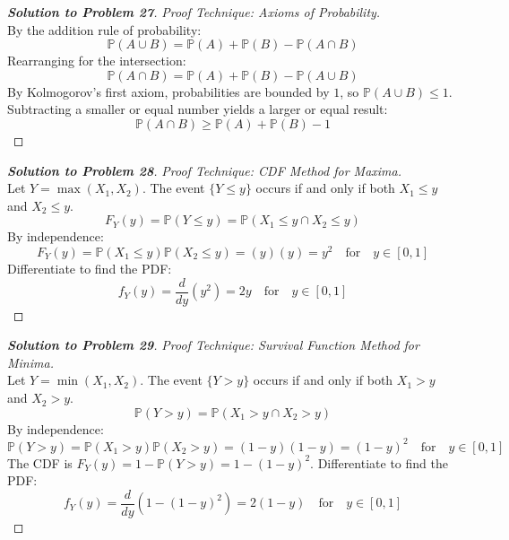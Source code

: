\documentclass[11pt, a4paper]{article}
\theoremstyle{definition}
\theoremstyle{remark}
\newcommand{\Prob}{\mathbb{P}}
\begin{document}
\begin{proof}[\textbf{Solution to Problem 27}]
\textit{Proof Technique: Axioms of Probability.} \\
By the addition rule of probability:
\[ \Prob(A \cup B) = \Prob(A) + \Prob(B) - \Prob(A \cap B) \]
Rearranging for the intersection:
\[ \Prob(A \cap B) = \Prob(A) + \Prob(B) - \Prob(A \cup B) \]
By Kolmogorov's first axiom, probabilities are bounded by $1$, so $\Prob(A \cup B) \leq 1$.
Subtracting a smaller or equal number yields a larger or equal result:
\[ \Prob(A \cap B) \geq \Prob(A) + \Prob(B) - 1 \]
\end{proof}

\begin{proof}[\textbf{Solution to Problem 28}]
\textit{Proof Technique: CDF Method for Maxima.} \\
Let $Y = \max(X_1, X_2)$. The event $\{Y \leq y\}$ occurs if and only if both $X_1 \leq y$ and $X_2 \leq y$.
\[ F_Y(y) = \Prob(Y \leq y) = \Prob(X_1 \leq y \cap X_2 \leq y) \]
By independence:
\[ F_Y(y) = \Prob(X_1 \leq y)\Prob(X_2 \leq y) = (y)(y) = y^2 \quad \text{for} \quad y \in [0, 1] \]
Differentiate to find the PDF:
\[ f_Y(y) = \frac{d}{dy} (y^2) = 2y \quad \text{for} \quad y \in [0, 1] \]
\end{proof}

\begin{proof}[\textbf{Solution to Problem 29}]
\textit{Proof Technique: Survival Function Method for Minima.} \\
Let $Y = \min(X_1, X_2)$. The event $\{Y > y\}$ occurs if and only if both $X_1 > y$ and $X_2 > y$.
\[ \Prob(Y > y) = \Prob(X_1 > y \cap X_2 > y) \]
By independence:
\[ \Prob(Y > y) = \Prob(X_1 > y)\Prob(X_2 > y) = (1-y)(1-y) = (1-y)^2 \quad \text{for} \quad y \in [0, 1] \]
The CDF is $F_Y(y) = 1 - \Prob(Y > y) = 1 - (1-y)^2$.
Differentiate to find the PDF:
\[ f_Y(y) = \frac{d}{dy} \left( 1 - (1-y)^2 \right) = 2(1-y) \quad \text{for} \quad y \in [0, 1] \]
\end{proof}
\end{document}
